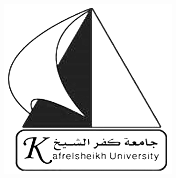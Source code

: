 \begin{minipage}{0.2\textwidth}
    \begin{flushright}
        \includegraphics[width=0.9\linewidth]{FrontMatter/Figures/ksu.png}  %
    \end{flushright}
\end{minipage}
\vspace{0.2cm}

\vspace*{\fill}

